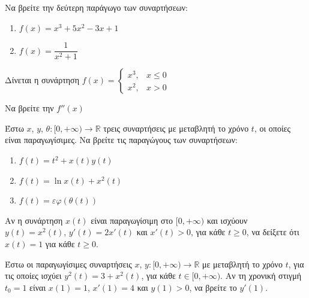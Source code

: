 \documentclass{presentation}
\begin{document}
\begin{askisi}
  Να βρείτε την δεύτερη παράγωγο των συναρτήσεων:
  \begin{enumerate}
    \item<1-> $f(x)=x^3+5x^2-3x+1$
    \item<2-> $f(x)=\dfrac{1}{x^2+1}$
  \end{enumerate}

\end{askisi}

\begin{askisi}
  Δίνεται η συνάρτηση
  $f(x)=\begin{cases}
      x^3, & x\le 0 \\
      x^2, & x>0
    \end{cases}$

  Να βρείτε την $f''(x)$

\end{askisi}

\begin{askisi}
  Έστω $x$, $y$, $θ:[0,+\infty)\to \mathbb{R}$ τρεις συναρτήσεις με μεταβλητή το χρόνο $t$, οι οποίες είναι παραγωγίσιμες. Να βρείτε τις παραγώγους των συναρτήσεων:
  \begin{enumerate}
    \item<1-> $f(t)=t^2+x(t)y(t)$
    \item<2-> $f(t)=\ln x(t) +x^2(t)$
    \item<3-> $f(t)=εφ(θ(t))$
  \end{enumerate}

\end{askisi}

\begin{askisi}
  Αν η συνάρτηση $x(t)$ είναι παραγωγίσιμη στο $[0,+\infty)$ και ισχύουν $y(t)=x^2(t)$, $y'(t)=2x'(t)$ και $x'(t)>0$, για κάθε $t\ge 0$, να δείξετε ότι $x(t)=1$ για κάθε $t\ge 0$.

\end{askisi}

\begin{askisi}
  Έστω οι παραγωγίσιμες συναρτήσεις $x$, $y:[0,+\infty)\to\mathbb{R}$ με μεταβλητή το χρόνο $t$, για τις οποίες ισχύει $y^2(t)=3+x^2(t)$, για κάθε $t\in [0,+\infty )$. Αν τη χρονική στιγμή $t_0=1$ είναι $x(1)=1$, $x'(1)=4$ και $y(1)>0$, να βρείτε το $y'(1)$.

\end{askisi}
\end{document}
